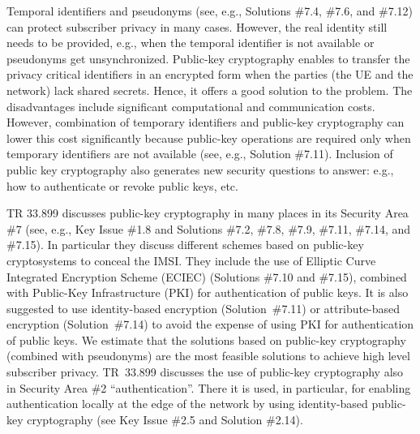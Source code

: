 \documentclass[12pt]{llncs}
\begin{document}
Temporal identifiers and pseudonyms (see, e.g., Solutions \#7.4, \#7.6, and \#7.12) can protect subscriber privacy in many cases. However, the real identity still needs to be provided, e.g., when the temporal identifier is not available or pseudonyms get unsynchronized. Public-key cryptography enables to transfer the privacy critical identifiers in an encrypted form when the parties (the UE and the network) lack shared secrets. Hence, it offers a good solution to the problem. The disadvantages include significant computational and communication costs. However, combination of temporary identifiers and public-key cryptography can lower this cost significantly because public-key operations are required only when temporary identifiers are not available (see, e.g., Solution \#7.11). Inclusion of public key cryptography also generates new security questions to answer: e.g., how to authenticate or revoke public keys, etc.

TR 33.899 discusses public-key cryptography in many places in its Security Area \#7 (see, e.g., Key Issue \#1.8 and Solutions \#7.2, \#7.8, \#7.9, \#7.11, \#7.14, and \#7.15). In particular they discuss different schemes based on public-key cryptosystems to conceal the IMSI. They include the use of Elliptic Curve Integrated Encryption Scheme (ECIEC) (Solutions \#7.10 and \#7.15), combined with Public-Key Infrastructure (PKI) for authentication of public keys. It is also suggested to use identity-based encryption (Solution~\#7.11) or attribute-based encryption (Solution~\#7.14) to avoid the expense of using PKI for authentication of public keys. We estimate that the solutions based on public-key cryptography (combined with pseudonyms) are the most feasible solutions to achieve high level subscriber privacy. TR~33.899 discusses the use of public-key cryptography also in Security Area \#2 ``authentication''. There it is used, in particular, for enabling authentication locally at the edge of the network by using identity-based public-key cryptography (see Key Issue \#2.5 and Solution \#2.14).




\end{document}
